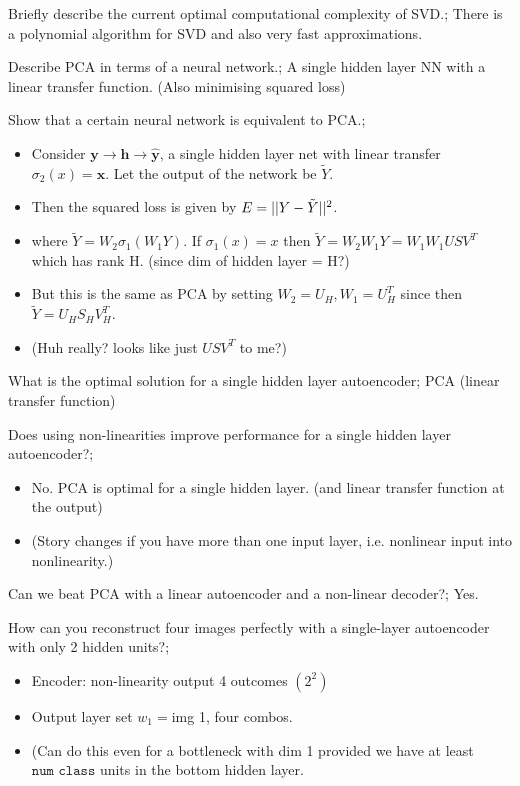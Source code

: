 \documentclass{article}
\begin{document}
Briefly describe the current optimal computational complexity of SVD.; There is a polynomial algorithm for SVD and also very fast approximations.

Describe PCA in terms of a neural network.; A single hidden layer NN with a linear transfer function. (Also minimising squared loss)

Show that a certain neural network is equivalent to PCA.; \begin{itemize} \item Consider $\bm{y}\rightarrow \bm{h}\rightarrow \hat{\bm{y}}$, a single hidden layer net with linear transfer $\sigma_2(x) = \bm{x}$. Let the output of the network be $\tilde{Y}$.  \item Then the squared loss is given by $E = ||Y - \Tilde{Y}||^2$. \item where $\tilde{Y}=W_2\sigma_1(W_1Y)$. If $\sigma_1(x) = x$ then $\tilde{Y}=W_2W_1Y = W_1W_1USV^T$ which has rank H. (since dim of hidden layer = H?) \item But this is the same as PCA by setting $W_2 = U_H, W_1 = U^T_H$ since then $\tilde{Y}=U_HS_HV_H^T$. \item (Huh really? looks like just $USV^T$ to me?) \end{itemize}

What is the optimal solution for a single hidden layer autoencoder; PCA (linear transfer function)

Does using non-linearities improve performance for a single hidden layer autoencoder?; \begin{itemize} \item No. PCA is optimal for a single hidden layer. (and linear transfer function at the output) \item (Story changes if you have more than one input layer, i.e. nonlinear input into nonlinearity.) \end{itemize}

Can we beat PCA with a linear autoencoder and a non-linear decoder?; Yes.

How can you reconstruct four images perfectly with a single-layer autoencoder with only 2 hidden units?; \begin{itemize} \item Encoder: non-linearity output 4 outcomes $(2^2)$ \item Output layer set $w_1=$img 1, four combos. \item (Can do this even for a bottleneck with dim 1 provided we have at least $\texttt{num class}$ units in the bottom hidden layer. \end{itemize}
\end{document}
